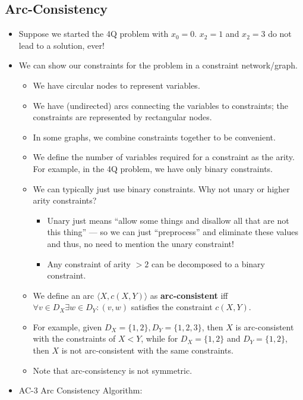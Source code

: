 \documentclass{article}
\begin{document}
\subsection{Arc-Consistency}
\begin{itemize}
    \item Suppose we started the 4Q problem with $x_0 = 0$.  $x_2 = 1$ and $x_2 = 3$ do not lead to a solution, ever!
    \item We can show our constraints for the problem in a constraint network/graph.
        \begin{itemize}
            \item We have circular nodes to represent variables.
            \item We have (undirected) arcs connecting the variables to constraints; the constraints are represented by rectangular nodes.
            \item In some graphs, we combine constraints together to be convenient.
            \item We define the number of variables required for a constraint as the arity.  For example, in the 4Q problem, we have only binary constraints.
            \item We can typically just use binary constraints.  Why not unary or higher arity constraints?
                \begin{itemize}
                    \item Unary just means ``allow some things and disallow all that are not this thing'' --- so we can just ``preprocess'' and eliminate these values and thus, no need to mention the unary constraint!
                    \item Any constraint of arity $> 2$ can be decomposed to a binary constraint.
                \end{itemize}
            \item We define an arc $\langle X, c(X, Y) \rangle$ as \textbf{arc-consistent} iff $\forall v \in D_X \exists w \in D_Y : (v, w)$ satisfies the constraint $c(X, Y)$.
            \item For example, given $D_X = \{1, 2\}, D_Y = \{1, 2, 3\}$, then $X$ is arc-consistent with the constraints of $X < Y$, while for $D_X = \{1, 2\}$ and $D_Y = \{1, 2\}$, then $X$ is not arc-consistent with the same constraints.
            \item Note that arc-consistency is not symmetric.
        \end{itemize}
    \item AC-3 Arc Consistency Algorithm:

\end{itemize}
\end{document}
